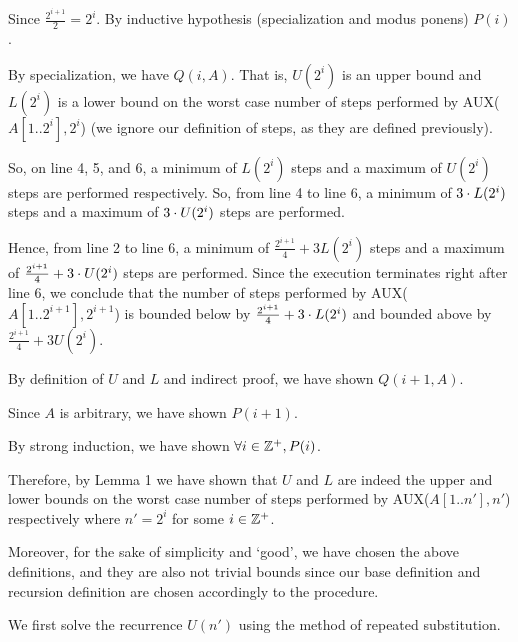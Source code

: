 \documentclass[11pt, sakura, night, 1in]{hw}
\begin{document}
{{{{{                    Since $\frac{2^{i+1}}{2}=2^i$. By inductive hypothesis (specialization and modus ponens) $P(i)$.

                    By specialization, we have $Q(i, A)$. That is, $U(2^i)$ is an upper bound and $L(2^i)$ is a lower bound on the worst case number of steps performed by AUX($A[1..2^i],2^i$) (we ignore our definition of steps, as they are defined previously).

                    So, on line 4, 5, and 6, a minimum of $L(2^i)$ steps and a maximum of $U(2^i)$ steps are performed respectively. So, from line 4 to line 6, a minimum of $3\cdot L(2^i)$ steps and a maximum of $3\cdot U(2^i)$ steps are performed.

                    Hence, from line 2 to line 6, a minimum of $\frac{2^{i+1}}{4}+3L(2^i)$ steps and a maximum of $\frac{2^{i+1}}{4}+3\cdot U(2^i)$ steps are performed. Since the execution terminates right after line 6, we conclude that the number of steps performed by AUX($A[1..2^{i+1}],2^{i+1}$) is bounded below by $\frac{2^{i+1}}{4}+3\cdot L(2^i)$ and bounded above by $\frac{2^{i+1}}{4}+3U(2^i)$.
                }

                By definition of $U$ and $L$ and indirect proof, we have shown $Q(i+1, A)$.
            }

            Since $A$ is arbitrary, we have shown $P(i+1)$.
        }
    }

    By strong induction, we have shown $\forall i\in\mathbb{Z}^+, P(i)$.
}

Therefore, by Lemma 1 we have shown that $U$ and $L$ are indeed the upper and lower bounds on the worst case number of steps performed by AUX($A[1..n'],n'$) respectively where $n'=2^i$ for some $i\in\mathbb{Z}^+$.

Moreover, for the sake of simplicity and `good', we have chosen the above definitions, and they are also not trivial bounds since our base definition and recursion definition are chosen accordingly to the procedure.

\begin{comment}
\newq{2}{
    Solve the recurrence $U(n')$ using the method of repeated substitution and verify.

    Do not use asymptotic notation.
}
\end{comment}


We first solve the recurrence $U(n')$ using the method of repeated substitution.
\end{document}
